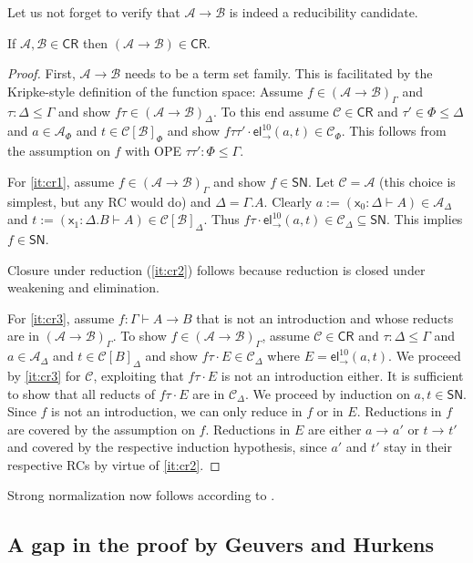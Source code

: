 \documentclass[a4paper,USenglish,cleveref, autoref, thm-restate]{lipics-v2019}
\newcommand{\x}{\mathsf{x}}
\newcommand{\tel}{\mathsf{el}}
\newcommand{\el}[2]{\ensuremath{\tel_{#1}^{#2}}}
\newcommand{\red}[1][]{\longrightarrow_{#1}}
\newcommand{\CR}{\mathsf{CR}}
\newcommand{\A}{\mathcal{A}}
\newcommand{\B}{\mathcal{B}}
\newcommand{\C}{\mathcal{C}}
\newcommand{\SN}{\mathsf{SN}}
\begin{document}
Let us not forget to verify that $\A \to \B$ is indeed a reducibility
candidate.
\begin{lemma}
  \label{lem:funcr}
  If $\A,\B \in \CR$ then $(\A \to \B) \in \CR$.
\end{lemma}
\begin{proof}
  First, $\A \to \B$ needs to be a term set family.
  This is facilitated by the Kripke-style definition of the function space:
  Assume $f \in (\A \to \B)_\Gamma$ and $\tau : \Delta \leq \Gamma$
  and show $f \tau \in (\A \to \B)_\Delta$.  To this end assume $\C
  \in \CR$ and $\tau' \in \Phi \leq \Delta$ and $a \in \A_\Phi$ and $t
  \in \C[\B]_\Phi$ and show $f\tau\tau' \cdot \el\to{10}(a,t) \in
  \C_\Phi$.  This follows from the assumption on $f$ with OPE
  $\tau\tau' : \Phi \leq \Gamma$.

  For \ref{it:cr1}, assume $f \in (\A \to \B)_\Gamma$ and show $f \in \SN$.
  Let $\C = \A$ (this choice is simplest, but any RC would do) and
  $\Delta = \Gamma.A$.  Clearly $a := (\x_0 : \Delta \vdash A) \in
  \A_\Delta$ and $t := (\x_1 : \Delta.B \vdash A) \in \C[\B]_\Delta$.
  Thus $f\tau \cdot \el\to{10}(a,t) \in \C_\Delta \subseteq \SN$.
  This implies $f \in \SN$.

  Closure under reduction (\ref{it:cr2}) follows because reduction is
  closed under weakening and elimination.

  For \ref{it:cr3}, assume $f : \Gamma \vdash A \to B$ that is not an
  introduction and whose reducts are in $(\A \to \B)_\Gamma$.  To show
  $f \in (\A \to \B)_\Gamma$, assume $\C \in \CR$ and $\tau : \Delta \leq \Gamma$ and
  $a \in \A_\Delta$ and $t \in \C[B]_\Delta$ and show $f\tau \cdot E \in
  \C_\Delta$ where $E = \el\to{10}(a,t)$.  We proceed by \ref{it:cr3}
  for $\C$, exploiting that $f\tau \cdot E$ is not an introduction
  either.  It is sufficient to show that all reducts of $f\tau \cdot
  E$ are in $\C_\Delta$.  We proceed by induction on $a,t \in \SN$.
  Since $f$ is not an introduction, we can only reduce in $f$ or in $E$.
  Reductions in $f$ are covered by the assumption on $f$.
  Reductions in $E$ are either $a \red a' $ or $t \red t'$ and covered by the
  respective induction hypothesis, since $a'$ and $t'$ stay in their
  respective RCs by virtue of \ref{it:cr2}.
\end{proof}

Strong normalization now follows according to .

\subsection{A gap in the proof by Geuvers and Hurkens}
\label{sec:gap}
\end{document}
